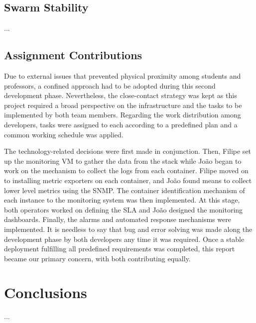 \documentclass[12pt]{article}
\begin{document}
\subsection{Swarm Stability} \label{remarks.stability} %


...

\subsection{Assignment Contributions} \label{remarks.contributions} %


Due to external issues that prevented physical proximity among students and professors, a confined approach had to be adopted during this second development phase.
Nevertheless, the close-contact strategy was kept as this project required a broad perspective on the infrastructure and the tasks to be implemented by both team members.
Regarding the work distribution among developers, tasks were assigned to each according to a predefined plan and a common working schedule was applied. 

The technology-related decisions were first made in conjunction.
Then, Filipe set up the monitoring VM to gather the data from the stack while João began to work on the mechanism to collect the logs from each container.
Filipe moved on to installing metric exporters on each container, and João found means to collect lower level metrics using the SNMP.
The container identification mechanism of each instance to the monitoring system was then implemented.
At this stage, both operators worked on defining the SLA and João designed the monitoring dashboards.
Finally, the alarms and automated response mechanisms were implemented.
It is needless to say that bug and error solving was made along the development phase by both developers any time it was required.
Once a stable deployment fulfilling all predefined requirements was completed, this report became our primary concern, with both contributing equally.

\newpage
\section*{Conclusions} \label{conclusions} %

...
\end{document}

